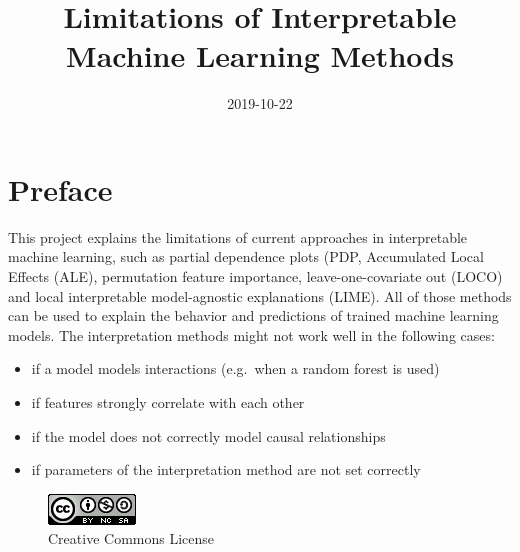 \documentclass[
]{krantz}
\title{Limitations of Interpretable Machine Learning Methods}
\date{2019-10-22}
\providecommand{\tightlist}{%
  \setlength{\itemsep}{0pt}\setlength{\parskip}{0pt}}
\begin{document}
\maketitle


\thispagestyle{empty}

\begin{center}
\end{center}

\setlength{\abovedisplayskip}{-5pt}
\setlength{\abovedisplayshortskip}{-5pt}

{
\hypersetup{linkcolor=}
\setcounter{tocdepth}{0}
\tableofcontents
}
\listoftables
\listoffigures
\hypertarget{preface}{%
\chapter*{Preface}\label{preface}}


This project explains the limitations of current approaches in interpretable machine learning, such as partial dependence plots (PDP, Accumulated Local Effects (ALE), permutation feature importance, leave-one-covariate out (LOCO) and local interpretable model-agnostic explanations (LIME).
All of those methods can be used to explain the behavior and predictions of trained machine learning models.
The interpretation methods might not work well in the following cases:

\begin{itemize}
\tightlist
\item
  if a model models interactions (e.g.~when a random forest is used)
\item
  if features strongly correlate with each other
\item
  if the model does not correctly model causal relationships
\item
  if parameters of the interpretation method are not set correctly
\end{itemize}

\begin{figure}
\centering
\includegraphics{images/by-nc-sa.png}
\caption{Creative Commons License}
\end{figure}
\end{document}
